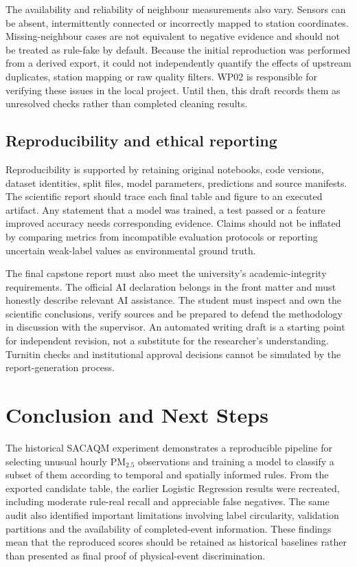 \documentclass[12pt,a4paper,oneside]{report}
\newcommand{\pmf}{PM$_{2.5}$}
\begin{document}
The availability and reliability of neighbour measurements also vary. Sensors can be absent, intermittently connected or incorrectly mapped to station coordinates. Missing-neighbour cases are not equivalent to negative evidence and should not be treated as rule-fake by default. Because the initial reproduction was performed from a derived export, it could not independently quantify the effects of upstream duplicates, station mapping or raw quality filters. WP02 is responsible for verifying these issues in the local project. Until then, this draft records them as unresolved checks rather than completed cleaning results.

\section{Reproducibility and ethical reporting}
Reproducibility is supported by retaining original notebooks, code versions, dataset identities, split files, model parameters, predictions and source manifests. The scientific report should trace each final table and figure to an executed artifact. Any statement that a model was trained, a test passed or a feature improved accuracy needs corresponding evidence. Claims should not be inflated by comparing metrics from incompatible evaluation protocols or reporting uncertain weak-label values as environmental ground truth.

The final capstone report must also meet the university's academic-integrity requirements. The official AI declaration belongs in the front matter and must honestly describe relevant AI assistance. The student must inspect and own the scientific conclusions, verify sources and be prepared to defend the methodology in discussion with the supervisor. An automated writing draft is a starting point for independent revision, not a substitute for the researcher's understanding. Turnitin checks and institutional approval decisions cannot be simulated by the report-generation process.

\chapter{Conclusion and Next Steps}
The historical SACAQM experiment demonstrates a reproducible pipeline for selecting unusual hourly \pmf{} observations and training a model to classify a subset of them according to temporal and spatially informed rules. From the exported candidate table, the earlier Logistic Regression results were recreated, including moderate rule-real recall and appreciable false negatives. The same audit also identified important limitations involving label circularity, validation partitions and the availability of completed-event information. These findings mean that the reproduced scores should be retained as historical baselines rather than presented as final proof of physical-event discrimination.
\end{document}

